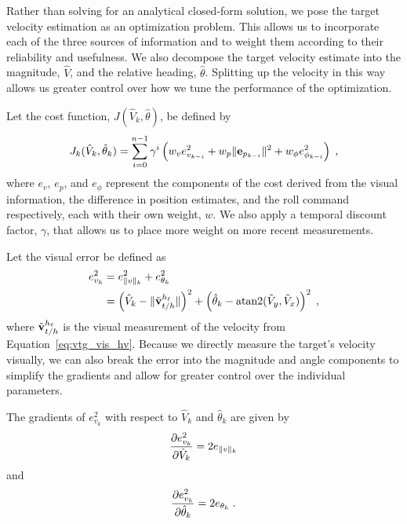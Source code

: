Rather than solving for an analytical closed-form solution, we pose the target velocity estimation as an optimization problem. This allows us to incorporate each of the three sources of information and to weight them according to their reliability and usefulness. We also decompose the target velocity estimate into the magnitude, $\hat{V}$, and the relative heading, $\hat{\theta}$. Splitting up the velocity in this way allows us greater control over how we tune the performance of the optimization.

Let the cost function, $J(\hat{V}_{k},\hat{\theta})$, be defined by
\begin{equation}
    J_k(\hat{V}_{k},\hat{\theta}_k) = \sum\limits_{i=0}^{n-1} \gamma^i \left(w_v e_{v_{k-i}}^2 + w_p \norm{\e_{p_{k-i}}}^2 + w_\phi e_{\phi_{k-i}}^2\right) \;,
\end{equation}
where $e_{v}$, $e_{p}$, and $e_{\phi}$ represent the components of the cost derived from the visual information, the difference in position estimates, and the roll command respectively, each with their own weight, $w$. We also apply a temporal discount factor, $\gamma$, that allows us to place more weight on more recent measurements.

Let the visual error be defined as
\begin{align}
    e_{v_{k}}^2 &= e_{\norm{v}_k}^2 + e_{\theta_k}^2 \\
        &= \left( \hat{V}_k - \norm{\veltghv[\tilde]} \right)^2 + \left( \hat{\theta}_k - \atantwo(\tilde{V}_y, \tilde{V}_x) \right)^2\;,
\end{align}
where $\veltghv[\tilde]$ is the visual measurement of the velocity from Equation~\eqref{eq:vtg_vis_hv}. Because we directly measure the target's velocity visually, we can also break the error into the magnitude and angle components to simplify the gradients and allow for greater control over the individual parameters.

The gradients of $e_{v_{k}}^2$ with respect to $\hat{V}_k$ and $\hat{\theta}_k$ are given by
\begin{equation}
    \pardd[e_{v_{k}}^2]{\hat{V}_k} = 2e_{\norm{v}_k}
\end{equation}
and
\begin{equation}
    \pardd[e_{v_{k}}^2]{\hat{\theta}_k} = 2e_{\theta_k}\;.
\end{equation}

